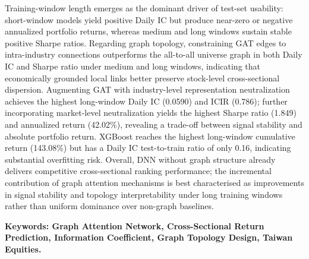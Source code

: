 Training-window length emerges as the dominant driver of test-set usability: short-window models yield positive Daily IC but produce near-zero or negative annualized portfolio returns, whereas medium and long windows sustain stable positive Sharpe ratios. Regarding graph topology, constraining GAT edges to intra-industry connections outperforms the all-to-all universe graph in both Daily IC and Sharpe ratio under medium and long windows, indicating that economically grounded local links better preserve stock-level cross-sectional dispersion. Augmenting GAT with industry-level representation neutralization achieves the highest long-window Daily IC (0.0590) and ICIR (0.786); further incorporating market-level neutralization yields the highest Sharpe ratio (1.849) and annualized return (42.02\%), revealing a trade-off between signal stability and absolute portfolio return. XGBoost reaches the highest long-window cumulative return (143.08\%) but has a Daily IC test-to-train ratio of only 0.16, indicating substantial overfitting risk. Overall, DNN without graph structure already delivers competitive cross-sectional ranking performance; the incremental contribution of graph attention mechanisms is best characterised as improvements in signal stability and topology interpretability under long training windows rather than uniform dominance over non-graph baselines.

\textbf{Keywords: Graph Attention Network, Cross-Sectional Return Prediction, Information Coefficient, Graph Topology Design, Taiwan Equities.}

